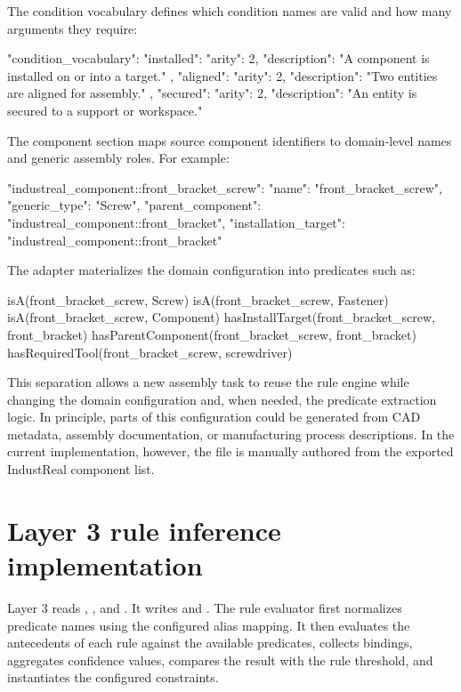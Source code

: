 The condition vocabulary defines which condition names are valid and how many arguments they require:

\begin{Code}
"condition_vocabulary": {
  "installed": {
    "arity": 2,
    "description": "A component is installed on or into a target."
  },
  "aligned": {
    "arity": 2,
    "description": "Two entities are aligned for assembly."
  },
  "secured": {
    "arity": 2,
    "description": "An entity is secured to a support or workspace."
  }
}
\end{Code}

The component section maps source component identifiers to domain-level names and generic assembly roles. For example:

\begin{Code}
"industreal_component::front_bracket_screw": {
  "name": "front_bracket_screw",
  "generic_type": "Screw",
  "parent_component": "industreal_component::front_bracket",
  "installation_target": "industreal_component::front_bracket"
}
\end{Code}

The adapter materializes the domain configuration into predicates such as:

\begin{Code}
    isA(front_bracket_screw, Screw)
    isA(front_bracket_screw, Fastener)
    isA(front_bracket_screw, Component)
    hasInstallTarget(front_bracket_screw, front_bracket)
    hasParentComponent(front_bracket_screw, front_bracket)
    hasRequiredTool(front_bracket_screw, screwdriver)
\end{Code}

This separation allows a new assembly task to reuse the rule engine while changing the domain configuration and, when needed, the predicate extraction logic. In principle, parts of this configuration could be generated from CAD metadata, assembly documentation, or manufacturing process descriptions. In the current implementation, however, the file is manually authored from the exported IndustReal component list.

\section{Layer 3 rule inference implementation}
\label{sec:implementation-layer3}

Layer 3 reads , , and . It writes  and . The rule evaluator first normalizes predicate names using the configured alias mapping. It then evaluates the antecedents of each rule against the available predicates, collects bindings, aggregates confidence values, compares the result with the rule threshold, and instantiates the configured constraints.

